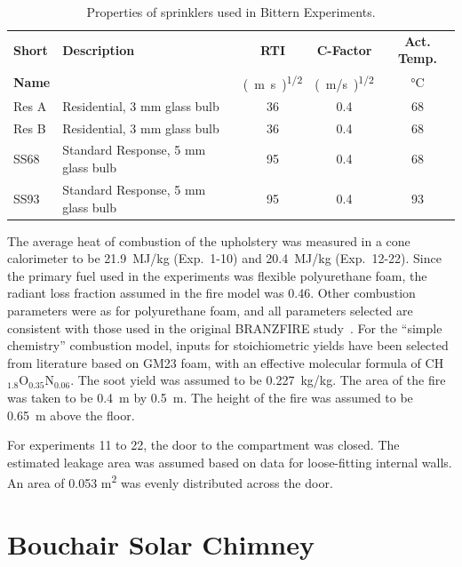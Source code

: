 \begin{table}[!ht]
\centering
\caption[Properties of sprinklers used in Bittern Experiments]{Properties of sprinklers used in Bittern Experiments.}
\label{Bittern_Sprinklers}
\begin{tabular}{|l|l|c|c|c|}
\hline
\textbf{Short} & \textbf{Description}                & \textbf{RTI}        & \textbf{C-Factor}  & \textbf{Act. Temp.} \\
\textbf{Name}  &                                     & \unit{(m.s)^{1/2}}  & \unit{(m/s)^{1/2}} & \unit{\degreeCelsius}           \\ \hline
Res A          & Residential, 3 mm glass bulb        & 36                  & 0.4               & 68                  \\ \hline
Res B          & Residential, 3 mm glass bulb        & 36                  & 0.4               & 68                  \\ \hline
SS68           & Standard Response, 5 mm glass bulb  & 95                  & 0.4               & 68                  \\ \hline
SS93           & Standard Response, 5 mm glass bulb  & 95                  & 0.4               & 93                  \\ \hline
\end{tabular}
\end{table}

The average heat of combustion of the upholstery was measured in a cone calorimeter to be 21.9~MJ/kg (Exp.~1-10) and 20.4~MJ/kg (Exp.~12-22). Since the primary fuel used in the experiments was flexible polyurethane foam, the radiant loss fraction assumed in the fire model was 0.46. Other combustion parameters were as for polyurethane foam, and all parameters selected are consistent with those used in the original BRANZFIRE study~\cite{Wade:FT2007}. For the ``simple chemistry'' combustion model, inputs for stoichiometric yields have been selected from literature based on GM23 foam, with an effective molecular formula of CH$_{1.8}$O$_{0.35}$N$_{0.06}$. The soot yield was assumed to be 0.227~kg/kg. The area of the fire was taken to be 0.4~m by 0.5~m. The height of the fire was assumed to be 0.65~m above the floor.

For experiments 11 to 22, the door to the compartment was closed. The estimated leakage area was assumed based on data for loose-fitting internal walls. An area of 0.053 m\textsuperscript{2} was evenly distributed across the door.


\section{Bouchair Solar Chimney}
\label{Bouchair_Solar_Chimney_Description}

